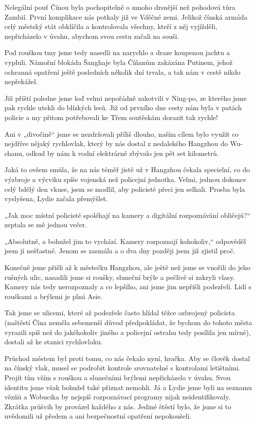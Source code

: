 Nelegální pouť Čínou byla pochopitelně o mnoho drsnější než pohodová tůra Zambií. První komplikace nás potkaly již ve Vděčné zemi. Jelikož čínská armáda celý městský stát obklíčila a kontrolovala všechny, kteří z něj vyjížděli, nepřicházelo v úvahu, abychom svou cestu začali na souši.

Pod rouškou tmy jsme tedy nasedli na narychlo a draze koupenou jachtu a vypluli. Námořní blokáda Šanghaje byla Číňanům zakázána Putinem, jehož ochranná opatření ještě posledních několik dní trvala, a tak nám v cestě nikdo nepřekážel.

Již příští poledne jsme loď velmi nepořádně zakotvili v Ning-po, ze kterého jsme pak rychle utekli do blízkých lesů. Již od prvního dne cesty nám byla v patách policie a my přitom potřebovali ke Třem soutěskám dorazit tak rychle! 

Ani v „divočině“ jsme se nezdržovali příliš dlouho, naším cílem bylo využít co nejdříve nějaký rychlovlak, který by nás dostal z nedalekého Hangzhou do Wu-chanu, odkud by nám k vodní elektrárně zbývalo jen pět set kilometrů. 

Jaká to ovšem smůla, že na nás téměř jistě už v Hangzhou čekala specielní, co do výzbroje a výcviku spíše vojenská než policejní jednotka. Velmi, jednou dokonce celý bdělý den vkuse, jsem se modlil, aby policisté přeci jen selhali. Prosba byla vyslyšena, Lydie začala přemýšlet.
	
„Jak moc místní policisté spoléhají na kamery a digitální rozpoznávání obličejů?“ zeptala se mě jednou večer.
	
„Absolutně, a bohužel jim to vychází. Kamery rozpoznají kohokoliv,“ odpověděl jsem jí nešťastně. Jenom se zasmála a o dva dny později jsem již zjistil proč.
	
Konečně jsme přišli až k městečku Hangzhou, ale ještě než jsme se vnořili do jeho rušných ulic, nasadili jsme si roušky, sluneční brýle a pečlivě si zakryli vlasy. Kamery nás tedy nerozpoznaly a co lepšího, ani jsme jim nepřišli podezřelí. Lidí s rouškami a brýlemi je plná Asie.
	
Tak jsme se ulicemi, které až podezřele často hlídal těžce ozbrojený policista (naštěstí Čína neměla sebemenší důvod předpokládat, že bychom do tohoto města vyrazili spíš než do jakéhokoliv jiného a policejní ostrahu tedy posílila jen mírně), dostali až ke stanici rychlovlaku.
	
Průchod městem byl proti tomu, co nás čekalo nyní, hračka. Aby se člověk dostal na čínský vlak, musel se podrobit kontrole srovnatelné s kontrolami letištními. Projít tím vším s rouškou a slunečními brýlemi nepřicházelo v úvahu. Svou identitu jsme však bohužel také přiznat nemohli. Já a Lydie jsme byli na seznamu vězňů a Wobucika by nejspíš rozpoznávací programy nijak neidentifikovaly. Zkrátka průšvih by provázel každého z nás. Jediné štěstí bylo, že jsme si to uvědomili už předem a ani bezpečnostní opatření nepokoušeli.
	
